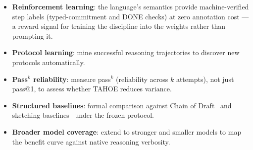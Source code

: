 \documentclass[11pt,a4paper]{article}
\begin{document}
\begin{itemize}[nosep,leftmargin=*]
    \item \textbf{Reinforcement learning}: the language's semantics provide machine-verified step labels (typed-commitment and DONE checks) at zero annotation cost --- a reward signal for training the discipline into the weights rather than prompting it.
    \item \textbf{Protocol learning}: mine successful reasoning trajectories to discover new protocols automatically.
    \item \textbf{Pass$^k$ reliability}: measure pass$^k$ (reliability across $k$ attempts), not just pass@1, to assess whether TAHOE reduces variance.
    \item \textbf{Structured baselines}: formal comparison against Chain of Draft~\cite{xu2025cod} and sketching baselines~\cite{lee2025sketch} under the frozen protocol.
    \item \textbf{Broader model coverage}: extend to stronger and smaller models to map the benefit curve against native reasoning verbosity.
\end{itemize}



\end{document}
